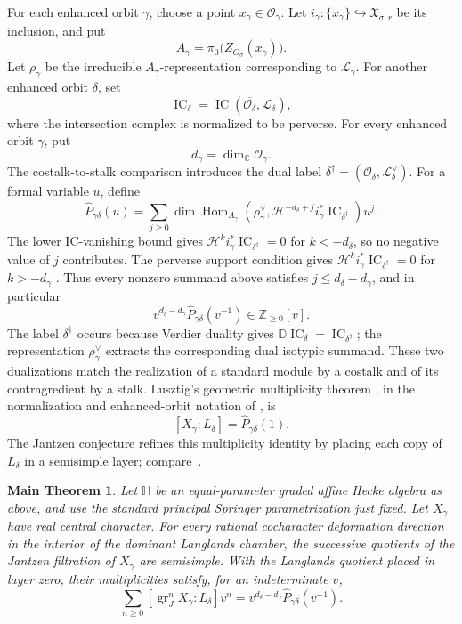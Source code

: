 \documentclass[10pt,a4paper]{amsart}
\newtheorem*{maintheorem}{Main Theorem}
\newcommand{\Hh}{\mathbb H}
\newcommand{\IC}{\operatorname{IC}}
\begin{document}
For each enhanced orbit $\gamma$, choose a point
$x_\gamma\in\mathcal O_\gamma$.  Let
$i_\gamma:\{x_\gamma\}\hookrightarrow\mathfrak X_{\sigma,r}$ be its
inclusion, and put
\[
 A_\gamma=\pi_0\bigl(Z_{G_\sigma}(x_\gamma)\bigr).
\]
Let $\rho_\gamma$ be the irreducible $A_\gamma$-representation
corresponding to $\mathcal L_\gamma$.  For another enhanced orbit $\delta$, set
\[
 \IC_\delta=\IC(\overline{\mathcal O_\delta},\mathcal L_\delta),
\]
where the intersection complex is normalized to be perverse.  For every
enhanced orbit $\gamma$, put
\[
 d_\gamma=\dim_{\mathbb C}\mathcal O_\gamma.
\]
The costalk-to-stalk comparison introduces the dual label
$\delta^\dagger=(\mathcal O_\delta,\mathcal L_\delta^\vee)$.  For a formal
variable $u$, define
\begin{equation}\label{eq:full-ic-polynomial}
 \widehat P_{\gamma\delta}(u)=
 \sum_{j\geq0}
 \dim\operatorname{Hom}_{A_\gamma}\!\left(
   \rho_\gamma^\vee,
   \mathcal H^{-d_\delta+j}i_\gamma^*\IC_{\delta^\dagger}
 \right)u^j.
\end{equation}
The lower IC-vanishing bound gives
$\mathcal H^k i_\gamma^*\IC_{\delta^\dagger}=0$ for $k<-d_\delta$, so no
negative value of $j$ contributes.  The perverse support condition gives
$\mathcal H^k i_\gamma^*\IC_{\delta^\dagger}=0$ for $k>-d_\gamma$
\cite[Section~2.2]{BBD}.  Thus every nonzero summand above satisfies
$j\leq d_\delta-d_\gamma$, and in particular
\[
 v^{d_\delta-d_\gamma}\widehat P_{\gamma\delta}(v^{-1})
 \in\mathbb Z_{\geq0}[v].
\]
The label $\delta^\dagger$ occurs because Verdier duality gives
$\mathbb D\IC_\delta=\IC_{\delta^\dagger}$; the representation
$\rho_\gamma^\vee$ extracts the corresponding dual isotypic summand.  These
two dualizations match the realization of a standard module by a costalk and
of its contragredient by a stalk.
Lusztig's geometric multiplicity theorem
\cite[Proposition~10.5 and Corollary~10.7]{LusztigCuspidalII}, in the
normalization and enhanced-orbit notation of
\cite[Proposition~5.1(a)]{Solleveld}, is
\[
 [X_\gamma:L_\delta]=\widehat P_{\gamma\delta}(1).
\]
The Jantzen conjecture refines this multiplicity identity by placing each
copy of $L_\delta$ in a semisimple
layer; compare~\cite[Conjecture~6.2.2]{BC}.

\begin{maintheorem}
Let $\Hh$ be an equal-parameter graded affine Hecke algebra as above, and use
the standard principal Springer parametrization just fixed.  Let $X_\gamma$ have
real central character.  For every rational cocharacter deformation
direction in the interior of the dominant Langlands chamber, the
successive quotients of the Jantzen filtration of $X_\gamma$ are semisimple.
With the Langlands quotient placed in layer zero, their multiplicities satisfy,
for an indeterminate $v$,
\begin{equation}\label{eq:layer-polynomial}
 \sum_{n\geq0}[\operatorname{gr}_J^nX_\gamma:L_\delta]v^n
 =v^{d_\delta-d_\gamma}\widehat P_{\gamma\delta}(v^{-1}).
\end{equation}
\end{maintheorem}
\end{document}
